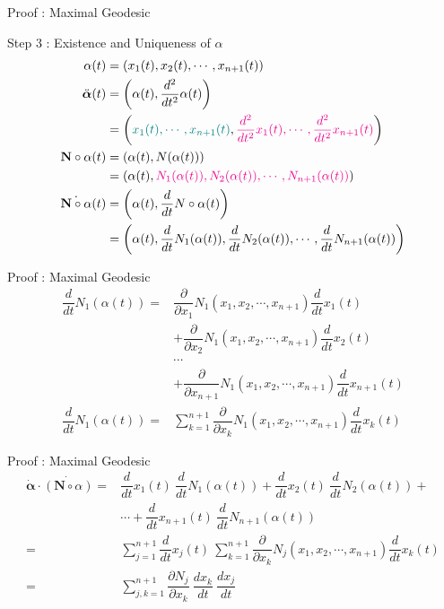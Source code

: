 \documentclass{beamer}
\begin{document}
\begin{frame}{Proof : Maximal Geodesic}
\begin{block}{Step 3 : Existence and Uniqueness of $\alpha$}
\begin{align}
	\alpha(t) & = (x_1(t), x_2(t), \cdots, x_{n+1}(t)) \\
	\ddot{\boldsymbol{\alpha}}(t) & = \left( \alpha(t),\dfrac{d^2}{dt^2} \alpha(t) \right) \nonumber\\
	& = \left( {\color{teal}x_1(t),\cdots,x_{n+1}(t)}, {\color{magenta}\dfrac{d^2}{dt^2}x_1(t),\cdots,\dfrac{d^2}{dt^2}x_{n+1}(t)} \right)\\
	\mathbf{N} \circ \alpha(t) & = \left( \alpha(t), N(\alpha(t)) \right) \nonumber\\
	& = \left(\alpha(t),{\color{magenta}N_1(\alpha(t)),N_2(\alpha(t)),\cdots,N_{n+1}(\alpha(t))} \right) \\
	\dot{\mathbf{N}\circ\alpha}(t) & = \left( \alpha(t),\dfrac{d}{dt}N \circ \alpha(t) \right) \nonumber\\
	& = \left( \alpha(t), \dfrac{d}{dt}N_1(\alpha(t)),\dfrac{d}{dt}N_2(\alpha(t)),\cdots,\dfrac{d}{dt}N_{n+1}(\alpha(t)) \right)
\end{align}
\end{block}
\end{frame}

\begin{frame}{Proof : Maximal Geodesic}
\begin{align}
	\dfrac{d}{dt}N_1(\alpha(t)) = & \dfrac{\partial}{\partial x_1}N_1(x_1,x_2,\cdots,x_{n+1}) \dfrac{d}{dt}x_1(t) \nonumber\\
	& + \dfrac{\partial}{\partial x_2}N_1(x_1,x_2,\cdots,x_{n+1}) \dfrac{d}{dt}x_2(t) \nonumber\\
	& \cdots \nonumber \\
	& + \dfrac{\partial}{\partial x_{n+1}}N_1(x_1,x_2,\cdots,x_{n+1}) \dfrac{d}{dt}x_{n+1}(t) \\
	\dfrac{d}{dt}N_1(\alpha(t)) = &  \sum_{k = 1}^{n+1} \dfrac{\partial}{\partial x_k} N_1(x_1,x_2,\cdots,x_{n+1}) \dfrac{d}{dt}x_k(t) 
\end{align}
\end{frame}

\begin{frame}{Proof : Maximal Geodesic}
\begin{align}
	\dot{\boldsymbol{\alpha}} \cdot \dot{(\mathbf{N} \circ \alpha)} = & \dfrac{d}{dt}x_1(t)\ \dfrac{d}{dt}N_1(\alpha(t)) + \dfrac{d}{dt}x_2(t)\ \dfrac{d}{dt}N_2(\alpha(t)) + \nonumber \\
	& \cdots + \dfrac{d}{dt}x_{n+1}(t)\ \dfrac{d}{dt}N_{n+1}(\alpha(t)) \\
	= &  \sum_{j=1}^{n+1} \dfrac{d}{dt}x_j(t)\ \sum_{k = 1}^{n+1} \dfrac{\partial}{\partial x_k} N_j(x_1,x_2,\cdots,x_{n+1}) \dfrac{d}{dt}x_k(t) \nonumber \\
	= & \sum_{j,k=1}^{n+1} \dfrac{\partial N_j}{\partial x_k}\ \dfrac{dx_k}{dt}\ \dfrac{dx_j}{dt} 
\end{align}
\end{frame}
\end{document}
